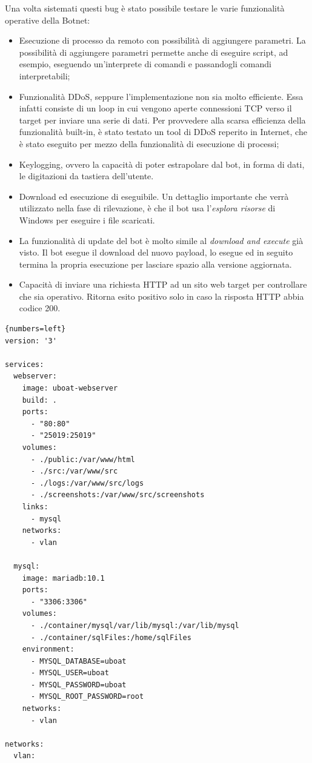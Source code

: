 Una volta sistemati questi bug è stato possibile testare le varie funzionalità operative della Botnet:
\begin{itemize}
    \item Esecuzione di processo da remoto con possibilità di aggiungere parametri. La possibilità di aggiungere parametri permette anche di eseguire script, ad esempio, eseguendo un'interprete di comandi e passandogli comandi interpretabili;
    \item Funzionalità DDoS, seppure l'implementazione non sia molto efficiente. Essa infatti consiste di un loop in cui vengono aperte connessioni TCP verso il target per inviare una serie di dati. Per provvedere alla scarsa efficienza della funzionalità built-in, è stato testato un tool di DDoS reperito in Internet, che è stato eseguito per mezzo della funzionalità di esecuzione di processi;
    \item Keylogging, ovvero la capacità di poter estrapolare  dal bot, in forma di dati, le digitazioni da tastiera dell'utente.
    \item Download ed esecuzione di eseguibile. Un dettaglio importante che verrà utilizzato nella fase di rilevazione, è che il bot usa l'\textit{esplora risorse} di Windows per eseguire i file scaricati.
    \item La funzionalità di update del bot è molto simile al \textit{download and execute} già visto. Il bot esegue il download del nuovo payload, lo esegue ed in seguito termina la propria esecuzione per lasciare spazio alla versione aggiornata.
    \item Capacità di inviare una richiesta HTTP ad un sito web target per controllare che sia operativo. Ritorna esito positivo solo in caso la risposta HTTP abbia codice 200.
\end{itemize}





\begin{lstlisting}[firstnumber=1,floatplacement=H,caption={File di configurazione docker compose},captionpos=b,label={listing-uboat2}]{numbers=left}
version: '3'

services:
  webserver:
    image: uboat-webserver
    build: .
    ports:
      - "80:80"
      - "25019:25019"
    volumes:
      - ./public:/var/www/html
      - ./src:/var/www/src
      - ./logs:/var/www/src/logs
      - ./screenshots:/var/www/src/screenshots
    links:
      - mysql
    networks:
      - vlan

  mysql:
    image: mariadb:10.1
    ports:
      - "3306:3306"
    volumes:
      - ./container/mysql/var/lib/mysql:/var/lib/mysql
      - ./container/sqlFiles:/home/sqlFiles
    environment:
      - MYSQL_DATABASE=uboat
      - MYSQL_USER=uboat
      - MYSQL_PASSWORD=uboat
      - MYSQL_ROOT_PASSWORD=root
    networks:
      - vlan

networks:
  vlan:
\end{lstlisting}

